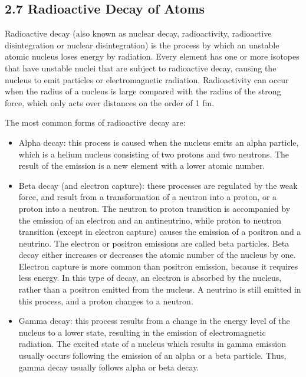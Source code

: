 \documentclass[
]{article}
\providecommand{\tightlist}{%
  \setlength{\itemsep}{0pt}\setlength{\parskip}{0pt}}
\providecommand{\tightlist}{%
  \setlength{\itemsep}{0pt}\setlength{\parskip}{0pt}}
\theoremstyle{definition}
\theoremstyle{definition}
\theoremstyle{definition}
\theoremstyle{remark}
\begin{document}
\hypertarget{radioactive-decay-of-atoms}{%
\subsection{\texorpdfstring{{2.7} Radioactive Decay of
Atoms}{2.7 Radioactive Decay of Atoms}}\label{radioactive-decay-of-atoms}}

Radioactive decay (also known as nuclear decay, radioactivity,
radioactive disintegration or nuclear disintegration) is the process by
which an unstable atomic nucleus loses energy by radiation. Every
element has one or more isotopes that have unstable nuclei that are
subject to radioactive decay, causing the nucleus to emit particles or
electromagnetic radiation. Radioactivity can occur when the radius of a
nucleus is large compared with the radius of the strong force, which
only acts over distances on the order of 1 fm.

The most common forms of radioactive decay are:

\begin{itemize}
\tightlist
\item
  Alpha decay: this process is caused when the nucleus emits an alpha
  particle, which is a helium nucleus consisting of two protons and two
  neutrons. The result of the emission is a new element with a lower
  atomic number.
\item
  Beta decay (and electron capture): these processes are regulated by
  the weak force, and result from a transformation of a neutron into a
  proton, or a proton into a neutron. The neutron to proton transition
  is accompanied by the emission of an electron and an antineutrino,
  while proton to neutron transition (except in electron capture) causes
  the emission of a positron and a neutrino. The electron or positron
  emissions are called beta particles. Beta decay either increases or
  decreases the atomic number of the nucleus by one. Electron capture is
  more common than positron emission, because it requires less energy.
  In this type of decay, an electron is absorbed by the nucleus, rather
  than a positron emitted from the nucleus. A neutrino is still emitted
  in this process, and a proton changes to a neutron.
\item
  Gamma decay: this process results from a change in the energy level of
  the nucleus to a lower state, resulting in the emission of
  electromagnetic radiation. The excited state of a nucleus which
  results in gamma emission usually occurs following the emission of an
  alpha or a beta particle. Thus, gamma decay usually follows alpha or
  beta decay.
\end{itemize}
\end{document}
